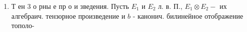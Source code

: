 \documentclass[10pt]{article}
\begin{document}
\begin{enumerate}
наделенного слабой топологией,- $E_{\sigma}^{\prime}$. Топология произвольного л. в. П. может рассматриваться как топология сходимости на нек-ром множестве подмножеств сопряженного пространства.



  \item Т ен 3 о рны е пр о и зведения. Пусть $E_{1}$ и $E_{2}$ л. в. П., $E_{1} \otimes E_{2}-$ их алгебраич. тензорное произведение и $b$ - канонич. билинейное отображение тополо-



\end{enumerate}
\end{document}
